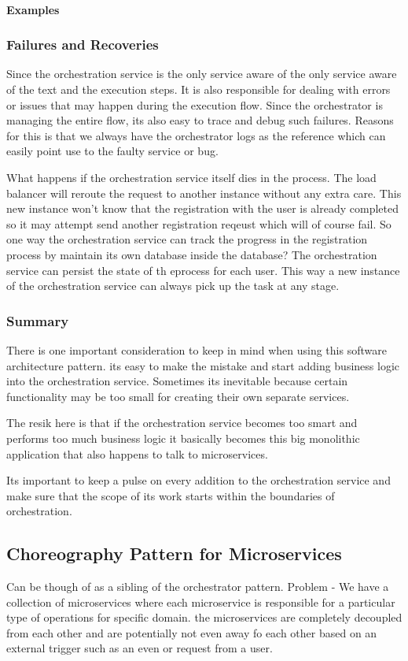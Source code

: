 \paragraph{Examples}

\subsubsection{Failures and Recoveries}
Since the orchestration service is the only service aware of the only service aware of the text and the execution steps.
It is also responsible for dealing with errors or issues that may happen during the execution flow.
Since the orchestrator is managing the entire flow, its also easy to trace and debug such failures.
Reasons for this is that we always have the orchestrator logs as the reference which can easily point use to the faulty service or bug.

What happens if the orchestration service itself dies in the process.
The load balancer will reroute the request to another instance without any extra care.
This new instance won't know that the registration with the user is already completed so it may attempt send another registration reqeust which will of course fail.
So one way the orchestration service can track the progress in the registration process by maintain its own database inside the database?
The orchestration service can persist the state of th eprocess for each user.
This way a new instance of the orchestration service can always pick up the task at any stage.

\subsubsection{Summary}
There is one important consideration to keep in mind when using this software architecture pattern.
its easy to make the mistake and start adding business logic into the orchestration service.
Sometimes its inevitable because certain functionality may be too small for creating their own separate services.

The resik here is that if the orchestration service becomes too smart and performs too much business logic it basically becomes this big monolithic application that also happens to talk to microservices.

Its important to keep a pulse on every addition to the orchestration service and make sure that the scope of its work starts within the boundaries of orchestration.

\subsection{Choreography Pattern for Microservices}
Can be though of as a sibling of the orchestrator pattern.
Problem - We have a collection of microservices where each microservice is responsible for a particular type of operations for specific domain.
the microservices are completely decoupled from each other and are potentially not even away fo each other based on an external trigger such as an even or request from a user.

